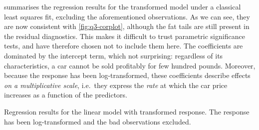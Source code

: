 \documentclass[titlepage]{article}
\begin{document}
 summarises the regression results for the transformed model under a classical least squares fit, excluding the aforementioned observations. As we can see, they are now consistent with \cref{fig:q3-corplot}, although the fat tails are still present in the residual diagnostics. This makes it difficult to trust parametric significance tests, and have therefore chosen not to include them here. The coefficients are dominated by the intercept term, which not surprising: regardless of its characteristics, a car cannot be sold profitably for few hundred pounds. Moreover, because the response has been log-transformed, these coefficients describe effects \emph{on a multiplicative scale}, i.e.\ they express the \emph{rate} at which the car price increases as a function of the predictors. 

\begin{table}[!htb]
  \centering
  
  \caption{Regression results for the linear model with transformed response. The response has been log-transformed and the bad observations excluded.}
  \label{tab:q3-reg-res}
\end{table}
\end{document}
